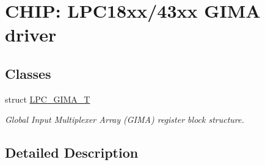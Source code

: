 \hypertarget{group___g_i_m_a__18_x_x__43_x_x}{}\section{C\+H\+IP\+: L\+P\+C18xx/43xx G\+I\+MA driver}
\label{group___g_i_m_a__18_x_x__43_x_x}
\subsection*{Classes}
\begin{DoxyCompactItemize}
\item 
struct \hyperlink{struct_l_p_c___g_i_m_a___t}{L\+P\+C\+\_\+\+G\+I\+M\+A\+\_\+T}
\begin{DoxyCompactList}\small\item\em Global Input Multiplexer Array (G\+I\+MA) register block structure. \end{DoxyCompactList}\end{DoxyCompactItemize}


\subsection{Detailed Description}
